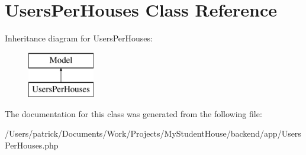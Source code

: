 \hypertarget{class_app_1_1_users_per_houses}{}\section{Users\+Per\+Houses Class Reference}
\label{class_app_1_1_users_per_houses}
Inheritance diagram for Users\+Per\+Houses\+:\begin{figure}[H]
\begin{center}
\leavevmode
\includegraphics[height=2.000000cm]{class_app_1_1_users_per_houses}
\end{center}
\end{figure}


The documentation for this class was generated from the following file\+:\begin{DoxyCompactItemize}
\item 
/\+Users/patrick/\+Documents/\+Work/\+Projects/\+My\+Student\+House/backend/app/Users\+Per\+Houses.\+php\end{DoxyCompactItemize}
